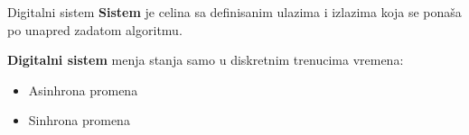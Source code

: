 \begin{frame}[label=01-s002]{Digitalni sistem}
\textbf{Sistem} je celina sa definisanim ulazima i izlazima koja se ponaša po unapred zadatom algoritmu.\par\vspace{3mm}
{\centering \par}
\textbf{Digitalni sistem} menja stanja samo u diskretnim trenucima vremena:
\begin{itemize}
\item Asinhrona promena
\item Sinhrona promena
\end{itemize}
\end{frame}
